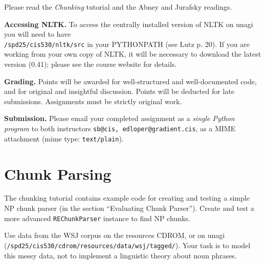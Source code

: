 \documentclass{cis530}
\begin{document}
\maketitle

Please read the \emph{Chunking} tutorial and the Abney and
Jurafsky readings.

{\bf Accessing NLTK.}  
To access the centrally installed version of NLTK on unagi you will
need to have\\ \texttt{/spd25/cis530/nltk/src} in your PYTHONPATH (see
Lutz p. 20).  If you are working from your own copy of NLTK, it will
be necessary to download the latest version (0.41); please see the
course website for details.

{\bf Grading.}
Points will be awarded for well-structured and well-documented code,
and for original and insightful discussion.
Points will be deducted for late submissions.  Assignments must be
strictly original work.

{\bf Submission.}  
Please email your completed assignment as a
\emph{single Python program} to both instructors
\texttt{sb@cis, edloper@gradient.cis}, as a MIME attachment
(mime type: \texttt{text/plain}).
\vspace{2ex}


\section{Chunk Parsing}

  The chunking tutorial contains example code for creating and testing
  a simple NP chunk parser (in the section ``Evaluating Chunk
  Parser'').  Create and test a more advanced \texttt{REChunkParser}
  instance to find NP chunks.

  Use data from the WSJ corpus on the resources CDROM, or on
  unagi (\texttt{/spd25/cis530/cdrom/resources/data/wsj/tagged/}).
  Your task is to model this messy data, not to
  implement a linguistic theory about noun phrases.
\end{document}
